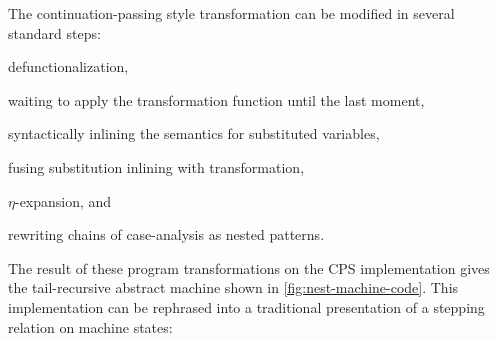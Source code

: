 \documentclass[sigplan,screen]{acmart}
\begin{document}
The continuation-passing style transformation can be modified in several
standard steps:
\begin{enumerate*}[(1)]
\item defunctionalization, 
\item waiting to apply the transformation function until the last moment,
\item syntactically inlining the semantics for substituted variables,
\item fusing substitution inlining with transformation,
\item $\eta$-expansion, and
\item rewriting chains of case-analysis as nested patterns.
\end{enumerate*}
The result of these program transformations on the CPS implementation gives the
tail-recursive abstract machine shown in \cref{fig:nest-machine-code}.  This
implementation can be rephrased into a traditional presentation of a stepping
relation on machine states:
\end{document}
